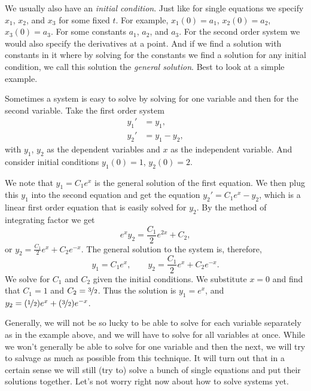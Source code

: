 We usually also have an
\emph{initial condition}.  Just like
for single equations we specify $x_1$, $x_2$, and $x_3$ for some fixed $t$.
For example, $x_1(0) = a_1$, $x_2(0) = a_2$, $x_3(0) = a_3$.
For some constants $a_1$, $a_2$, and $a_3$.  For the second order system
we would also specify the derivatives at a point.
And if we find a solution with constants in it where by solving for the
constants we find a solution for any initial condition, we call this
solution the \emph{general solution}.
Best to look at a simple example.

\begin{example}
Sometimes a system is easy to solve
by solving for one variable and then for the second variable.
Take 
the first order system
\begin{align*}
y_1' & = y_1 , \\
y_2' & = y_1 - y_2 ,
\end{align*}
with $y_1$, $y_2$ as the dependent variables and $x$ as the independent
variable.  And consider initial conditions
$y_1(0) = 1$, $y_2(0) = 2$.

We note that $y_1 = C_1 e^x$ is the general solution of the first equation.
We then plug this $y_1$ into the second equation
and get the equation $y_2' = C_1e^x - y_2$, which is a linear first order
equation that is easily solved for $y_2$.  By the method of integrating
factor we get
\begin{equation*}
e^x y_2 = \frac{C_1}{2}e^{2x} + C_2 ,
\end{equation*}
or $y_2 = \frac{C_1}{2}e^{x} + C_2e^{-x}$.  The general solution to the system
is, therefore,
\begin{equation*}
y_1 = C_1 e^x , \qquad
y_2 = \frac{C_1}{2}e^{x} + C_2e^{-x} .
\end{equation*}
We solve for $C_1$ and $C_2$ given the initial conditions.
We substitute $x=0$ and find
that $C_1=1$ and $C_2=\nicefrac{3}{2}$.  Thus the solution is
$y_1 = e^x$, and
$y_2 = (\nicefrac{1}{2}) e^x + (\nicefrac{3}{2}) e^{-x}$.
\end{example}

Generally, we will not be so lucky to be able to solve for
each variable separately as in the 
example above, and we will have to solve for all variables at once.
While we won't generally be able to solve for one variable and then the
next, we will try to salvage as much as possible from this technique.
It will turn out that in a certain sense we will still (try to) solve
a bunch of single equations and put their solutions together.  Let's not
worry right now about how to solve systems yet.

